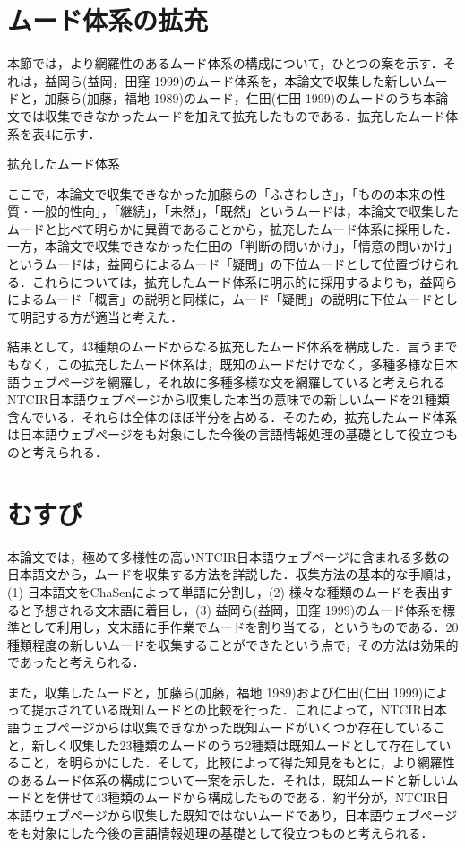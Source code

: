 \documentclass[japanese]{jnlp_1.4}
\begin{document}
\section{ムード体系の拡充}

本節では，より網羅性のあるムード体系の構成について，ひとつの案を示す．それは，益岡ら(益岡，田窪 1999)のムード体系を，本論文で収集した新しいムードと，加藤ら(加藤，福地 1989)のムード，仁田(仁田 1999)のムードのうち本論文では収集できなかったムードを加えて拡充したものである．拡充したムード体系を表4に示す．

\begin{table}[b]
\caption{拡充したムード体系}

\end{table}

ここで，本論文で収集できなかった加藤らの「ふさわしさ」，「ものの本来の性質・一般的性向」，「継続」，「未然」，「既然」というムードは，本論文で収集したムードと比べて明らかに異質であることから，拡充したムード体系に採用した．一方，本論文で収集できなかった仁田の「判断の問いかけ」，「情意の問いかけ」というムードは，益岡らによるムード「疑問」の下位ムードとして位置づけられる．これらについては，拡充したムード体系に明示的に採用するよりも，益岡らによるムード「概言」の説明と同様に，ムード「疑問」の説明に下位ムードとして明記する方が適当と考えた．

結果として，43種類のムードからなる拡充したムード体系を構成した．言うまでもなく，この拡充したムード体系は，既知のムードだけでなく，多種多様な日本語ウェブページを網羅し，それ故に多種多様な文を網羅していると考えられるNTCIR日本語ウェブページから収集した本当の意味での新しいムードを21種類含んでいる．それらは全体のほぼ半分を占める．そのため，拡充したムード体系は日本語ウェブページをも対象にした今後の言語情報処理の基礎として役立つものと考えられる．




\section{むすび}

本論文では，極めて多様性の高いNTCIR日本語ウェブページに含まれる多数の日本語文から，ムードを収集する方法を詳説した．収集方法の基本的な手順は，(1) 
日本語文をChaSenによって単語に分割し，(2) 
様々な種類のムードを表出すると予想される文末語に着目し，(3) 
益岡ら(益岡，田窪 1999)のムード体系を標準として利用し，文末語に手作業でムードを割り当てる，というものである．20種類程度の新しいムードを収集することができたという点で，その方法は効果的であったと考えられる．

また，収集したムードと，加藤ら(加藤，福地 1989)および仁田(仁田 1999)によって提示されている既知ムードとの比較を行った．これによって，NTCIR日本語ウェブページからは収集できなかった既知ムードがいくつか存在していること，新しく収集した23種類のムードのうち2種類は既知ムードとして存在していること，を明らかにした．そして，比較によって得た知見をもとに，より網羅性のあるムード体系の構成について一案を示した．それは，既知ムードと新しいムードとを併せて43種類のムードから構成したものである．約半分が，NTCIR日本語ウェブページから収集した既知ではないムードであり，日本語ウェブページをも対象にした今後の言語情報処理の基礎として役立つものと考えられる．
\end{document}
